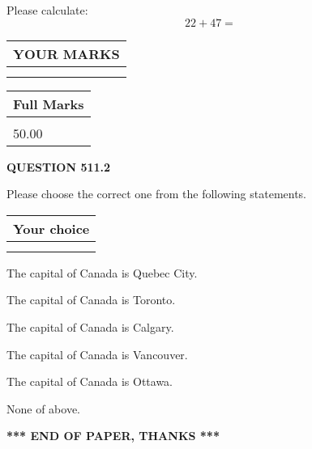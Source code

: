 \documentclass[12pt]{article}
\begin{document}
  
 
Please calculate:
\begin{equation}
22 +  %
47 = \nonumber
\end{equation}
 

 

 
  
\vspace{0.2in}
  
\noindent\begin{tabular}{|l|}
\hline
 YOUR MARKS  \\
\hline
 \\ 
 \\ 
\hline
\end{tabular}
\hspace{0.05in} \begin{tabular}{|l|}
\hline
 Full Marks  \\
\hline
 \\ 
50.00 \\
\hline
\end{tabular}
{\textbf{\Large{QUESTION
511.2 
}}}
  
  
Please choose the correct one from the following statements.
  
  
\noindent\hspace{3.0in} \begin{tabular}{|l|}
\hline
Your choice \\
\hline
 \\ 
 \\ 
\hline
\end{tabular}
  
  
 
 
The capital of Canada is Quebec City.
 
 
The capital of Canada is Toronto.
 
 
The capital of Canada is Calgary.
 
 
The capital of Canada is Vancouver.
 
 
The capital of Canada is Ottawa.
 
 
 None of above.
 
 
   
   
 \vspace{0.2in}
 
   
   
   
   
\vspace{1.0in} 
{\textbf{\large{ *** END OF PAPER, THANKS *** }}} 
   
\end{document}
